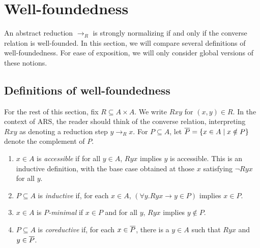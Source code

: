 \section{Well-foundedness}

\newcommand{\then}{\Longrightarrow}
\label{sec:Well-foundedness}



\newcommand{\gWF}{\mathbf{WF}}
\newcommand{\WF}{\mathrm{WF}}

An abstract reduction $\to_R$ is strongly normalizing
if and only if the converse relation is well-founded.
In this section, we will compare several definitions of well-foundedness.
For ease of exposition, we will only consider global versions of these notions.


\subsection{Definitions of well-foundedness}

For the rest of this section, fix $R \subseteq A \times A$.  We write $Rxy$ for $(x,y) \in R$. In the context of ARS, the reader should think of the converse relation,
interpreting $Rxy$ as denoting a reduction step $y \to_R x$. For $P \subseteq A$, let $\overline{P} = \{ x \in A \mid x \notin P\}$ denote the complement of $P$.
\begin{definition}\label{def:WFnotions} \hfill
   \begin{enumerate}
    \item $x \in A$ is \emph{accessible} if for all $y \in A$, $Ryx$ implies $y$ is accessible.
      This is an inductive definition, with the base case obtained at
     those $x$ satisfying $\lnot Ryx$ for all $y$.
    \item $P \subseteq A$ is \emph{inductive}
    if, for each $x \in A$, $(\forall y. Ryx \to y \in P)$ implies $x \in P$.


    \item $x \in A$ is \emph{$P$-minimal} if $x \in P$ and for all $y$,
    $Ryx$ implies $y \notin P$.

    \item $P \subseteq A$ is \emph{coreductive} if, for each $x \in \overline{P}$, there is a $y \in A$ such that $Ryx$ and $y \in \overline{P}$.

  \end{enumerate}
\end{definition}

